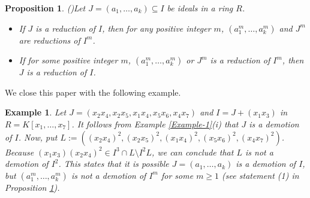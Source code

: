 \documentclass[11pt]{amsart}
\newtheorem{proposition}[theorem]{Proposition}
\newtheorem{example}[theorem]{Example}
\begin{document}

 \begin{proposition}(\cite[Proposition 8.1.5]{HS})\label{reduction-3}
  Let  $J=(a_1, \ldots, a_k) \subseteq I$  be ideals in a ring $R$.
  \begin{itemize}
  \item[(1)]  If  $J$ is a reduction of  $I$, then for any positive integer $m$, $(a^m_1, \dots,  a^m_k)$ and $J^m$ are reductions of $I^m$.
  \item[(2)]   If for some positive integer $m$, $(a^m_1, \ldots, a^m_k)$ or  $J^m$ is a reduction of  $I^m$, then $J$ is a reduction of  $I$.
  \end{itemize}
\end{proposition}
 
We close this paper with the following example. 
 \begin{example}\label{Example-5}
 \em{
  Let  $J=(x_2x_4, x_2x_5, x_1x_4, x_5x_6, x_4x_7)$ and $I=J+(x_1x_3)$ in  $R=K[x_1, \ldots, x_7]$. 
  It follows from Example \ref{Example-1}(i)  that  $J$ is  a demotion of $I$.  Now, put  $L:=((x_2x_4)^2, (x_2x_5)^2, (x_1x_4)^2, (x_5x_6)^2, (x_4x_7)^2)$. 
  Because  $(x_1x_3)(x_2x_4)^2 \in I^3 \cap L \setminus I^2L$, we can conclude  that $L$ is not a demotion of $I^2$. This states that it is possible 
  $J=(a_1, \ldots, a_k)$  is a demotion of  $I$, but  $(a^m_1, \dots,  a^m_k)$ is not  a demotion  of $I^m$ for some $m\geq 1$ (see statement (1) in Proposition 
  \ref{reduction-3}).
  }
\end{example}


\end{document}
